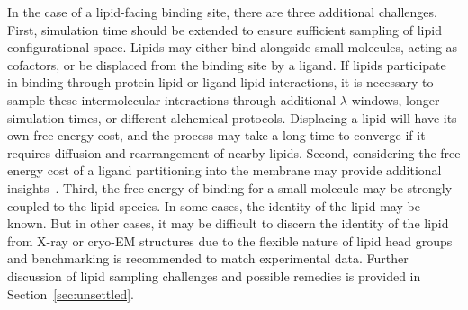 \documentclass[9pt,bestpractices]{livecoms}
\begin{document}
In the case of a lipid-facing binding site, there are three additional challenges. First, simulation time should be extended to ensure sufficient sampling of lipid configurational space. Lipids may either bind alongside small molecules, acting as cofactors, or be displaced from the binding site by a ligand. If lipids participate in binding through protein-lipid or ligand-lipid interactions, it is necessary to sample these intermolecular interactions through additional $\lambda$ windows, longer simulation times, or different alchemical protocols. Displacing a lipid will have its own free energy cost, and the process may take a long time to converge if it requires diffusion and rearrangement of nearby lipids. Second, considering the free energy cost of a ligand partitioning into the membrane may provide additional insights~\cite{dickson2021relative}. Third, the free energy of binding for a small molecule may be strongly coupled to the lipid species. In some cases, the identity of the lipid may be known. But in other cases, it may be difficult to discern the identity of the lipid from X-ray or cryo-EM structures due to the flexible nature of lipid head groups and benchmarking is recommended to match experimental data.  Further discussion of lipid sampling challenges and possible remedies is provided in Section~\ref{sec:unsettled}.
\end{document}
